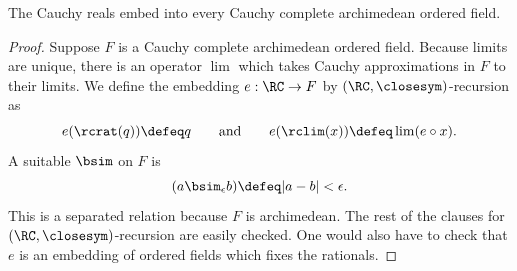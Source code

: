 %
\begin{thm} \label{RC-initial-Cauchy-complete}
  The Cauchy reals embed into every Cauchy complete ar\-chi\-me\-de\-an ordered field.
\end{thm}

\begin{proof}
  Suppose $F$ is a Cauchy complete archimedean ordered field. Because limits are unique,
  there is an operator $\lim$ which takes Cauchy approximations in $F$ to their limits. We
  define the embedding $e : \RC \to F$ by $(\RC, {\closesym})$-recursion as
  \begin{equation*}
    e(\rcrat(q)) \defeq q
    \qquad\text{and}\qquad
    e(\rclim(x)) \defeq \lim (e \circ x).
  \end{equation*}
  A suitable $\bsim$ on $F$ is
  \begin{equation*}
    (a \bsim_\epsilon b) \defeq |a - b| < \epsilon.
  \end{equation*}
  This is a separated relation because $F$ is archimedean. The rest of the clauses for
  $(\RC, {\closesym})$-recursion are easily checked. One would also have to check that $e$ is
  an embedding of ordered fields which fixes the rationals.
\end{proof}
